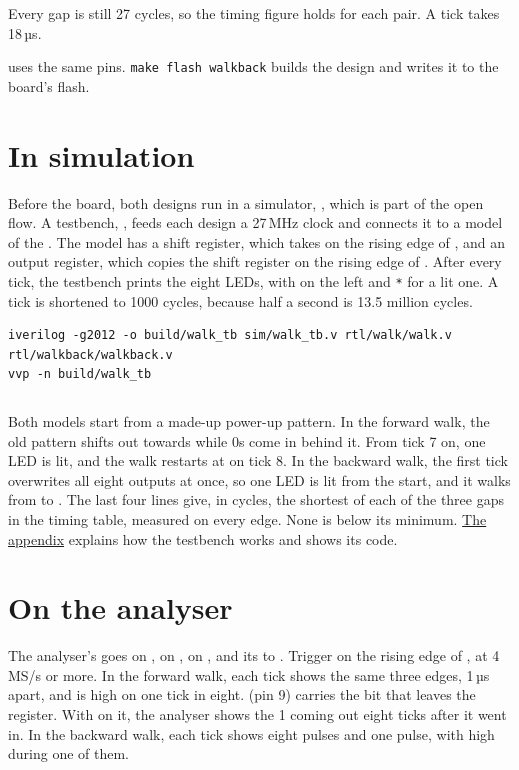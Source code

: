 \documentclass[11pt,a4paper]{article}
\begin{document}
Every gap is still 27 cycles, so the timing figure holds for each pair. A tick takes 18\,µs.

 uses the same pins. \texttt{make flash walkback} builds the design and writes it to the board’s flash.

\section*{In simulation}

Before the board, both designs run in a simulator, , which is part of the open flow. A testbench, , feeds each design a 27\,MHz clock and connects it to a model of the . The model has a shift register, which takes  on the rising edge of , and an output register, which copies the shift register on the rising edge of . After every tick, the testbench prints the eight LEDs, with  on the left and \texttt{*} for a lit one. A tick is shortened to 1000 cycles, because half a second is 13.5 million cycles.

\begin{verbatim}
iverilog -g2012 -o build/walk_tb sim/walk_tb.v rtl/walk/walk.v rtl/walkback/walkback.v
vvp -n build/walk_tb
\end{verbatim}

\inputminted{text}{data/walk_tb.txt}

Both models start from a made-up power-up pattern. In the forward walk, the old pattern shifts out towards  while 0s come in behind it. From tick 7 on, one LED is lit, and the walk restarts at  on tick 8. In the backward walk, the first tick overwrites all eight outputs at once, so one LED is lit from the start, and it walks from  to . The last four lines give, in cycles, the shortest of each of the three gaps in the timing table, measured on every edge. None is below its minimum. \hyperref[app:testbench]{The appendix} explains how the testbench works and shows its code.

\section*{On the analyser}

The analyser’s  goes on ,  on ,  on , and its  to . Trigger on the rising edge of , at 4\,MS/s or more. In the forward walk, each tick shows the same three edges, 1\,µs apart, and  is high on one tick in eight.  (pin 9) carries the bit that leaves the register. With  on it, the analyser shows the 1 coming out eight ticks after it went in. In the backward walk, each tick shows eight  pulses and one  pulse, with  high during one of them.
\end{document}
